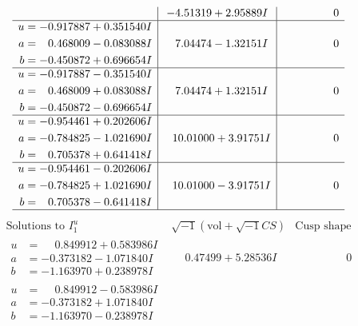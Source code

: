 \documentclass[1p]{elsarticle_modified}
\theoremstyle{definition}
\newcommand{\I}{\sqrt{-1}}
\begin{document}
$$\begin{array}{c|c|c}
 & -4.51319 + 2.95889 I & \phantom{-0.000000 } 0 \\ \hline\begin{aligned}
u &= -0.917887 + 0.351540 I \\
a &= \phantom{-}0.468009 - 0.083088 I \\
b &= -0.450872 + 0.696654 I\end{aligned}
 & \phantom{-}7.04474 - 1.32151 I & \phantom{-0.000000 } 0 \\ \hline\begin{aligned}
u &= -0.917887 - 0.351540 I \\
a &= \phantom{-}0.468009 + 0.083088 I \\
b &= -0.450872 - 0.696654 I\end{aligned}
 & \phantom{-}7.04474 + 1.32151 I & \phantom{-0.000000 } 0 \\ \hline\begin{aligned}
u &= -0.954461 + 0.202606 I \\
a &= -0.784825 - 1.021690 I \\
b &= \phantom{-}0.705378 + 0.641418 I\end{aligned}
 & \phantom{-}10.01000 + 3.91751 I & \phantom{-0.000000 } 0 \\ \hline\begin{aligned}
u &= -0.954461 - 0.202606 I \\
a &= -0.784825 + 1.021690 I \\
b &= \phantom{-}0.705378 - 0.641418 I\end{aligned}
 & \phantom{-}10.01000 - 3.91751 I & \phantom{-0.000000 } 0\\
 \hline 
 \end{array}$$\newpage$$\begin{array}{c|c|c}  
\text{Solutions to }I^u_{1}& \I (\text{vol} + \sqrt{-1}CS) & \text{Cusp shape}\\
 \hline 
\begin{aligned}
u &= \phantom{-}0.849912 + 0.583986 I \\
a &= -0.373182 - 1.071840 I \\
b &= -1.163970 + 0.238978 I\end{aligned}
 & \phantom{-}0.47499 + 5.28536 I & \phantom{-0.000000 } 0 \\ \hline\begin{aligned}
u &= \phantom{-}0.849912 - 0.583986 I \\
a &= -0.373182 + 1.071840 I \\
b &= -1.163970 - 0.238978 I\end{aligned}

\end{array}$$
\end{document}
